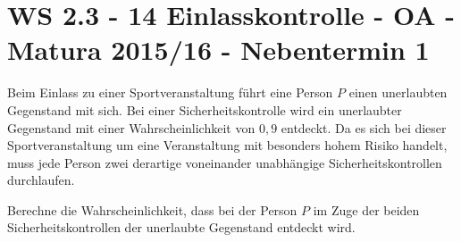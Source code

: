 \section{WS 2.3 - 14 Einlasskontrolle - OA - Matura
2015/16 - Nebentermin 1}

\begin{beispiel}{1} %
Beim Einlass zu einer Sportveranstaltung führt eine Person $P$ einen unerlaubten Gegenstand mit
sich. Bei einer Sicherheitskontrolle wird ein unerlaubter Gegenstand mit einer Wahrscheinlichkeit
von $0,9$ entdeckt. Da es sich bei dieser Sportveranstaltung um eine Veranstaltung mit besonders
hohem Risiko handelt, muss jede Person zwei derartige voneinander unabhängige Sicherheitskontrollen
durchlaufen. \leer

Berechne die Wahrscheinlichkeit, dass bei der Person $P$ im Zuge der beiden Sicherheitskontrollen
der unerlaubte Gegenstand entdeckt wird.


\end{beispiel}